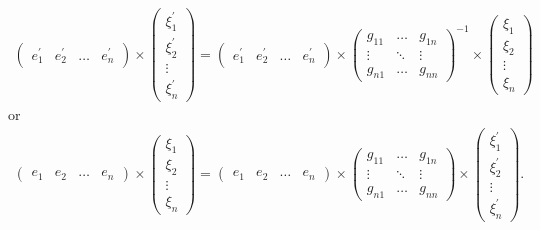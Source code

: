 \documentclass[a4paper,10pt]{amsart}
\begin{document}
\begin{align*}
   \begin{pmatrix}
        e_{1}^{'} & e_{2}^{'} & \ldots & e_{n}^{'} 
   \end{pmatrix} \times
    \begin{pmatrix}
       \xi_{1}^{'}\\
       \xi_{2}^{'}\\
       \vdots\\
       \xi_{n}^{'}
   \end{pmatrix} 
   = 
   \begin{pmatrix}
        e_{1}^{'} & e_{2}^{'} & \ldots & e_{n}^{'} 
   \end{pmatrix} \times
   \begin{pmatrix}
       g_{11} & \ldots & g_{1n}\\
       \vdots      & \ddots & \vdots \\
       g_{n1} & \ldots & g_{nn}
   \end{pmatrix}^{-1} \times
    \begin{pmatrix}
       \xi_1\\
       \xi_2\\
       \vdots\\
       \xi_n
   \end{pmatrix}
\end{align*}
or
\begin{align*}
    \begin{pmatrix}
       e_1 & e_2 & \ldots & e_n 
    \end{pmatrix} \times
    \begin{pmatrix}
       \xi_1\\
       \xi_2\\
       \vdots\\
       \xi_n
   \end{pmatrix}
  = 
    \begin{pmatrix}
       e_1 & e_2 & \ldots & e_n 
    \end{pmatrix} \times
  \begin{pmatrix}
       g_{11} & \ldots & g_{1n}\\
       \vdots      & \ddots & \vdots \\
       g_{n1} & \ldots & g_{nn}
   \end{pmatrix}\times
    \begin{pmatrix}
       \xi_{1}^{'}\\
       \xi_{2}^{'}\\
       \vdots\\
       \xi_{n}^{'}
   \end{pmatrix}.
\end{align*}
\end{document}
